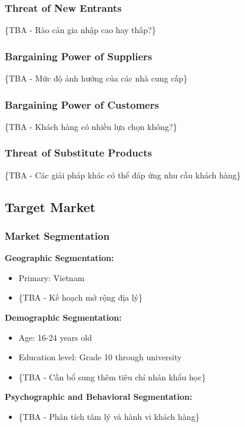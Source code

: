 \subsubsection{Threat of New Entrants}
\{TBA - Rào cản gia nhập cao hay thấp?\}

\subsubsection{Bargaining Power of Suppliers}
\{TBA - Mức độ ảnh hưởng của các nhà cung cấp\}

\subsubsection{Bargaining Power of Customers}
\{TBA - Khách hàng có nhiều lựa chọn không?\}

\subsubsection{Threat of Substitute Products}
\{TBA - Các giải pháp khác có thể đáp ứng nhu cầu khách hàng\}

\subsection{Target Market}
\subsubsection{Market Segmentation}
\textbf{Geographic Segmentation:}
\begin{itemize}
    \item Primary: Vietnam
    \item \{TBA - Kế hoạch mở rộng địa lý\}
\end{itemize}

\textbf{Demographic Segmentation:}
\begin{itemize}
    \item Age: 16-24 years old
    \item Education level: Grade 10 through university
    \item \{TBA - Cần bổ sung thêm tiêu chí nhân khẩu học\}
\end{itemize}

\textbf{Psychographic and Behavioral Segmentation:}
\begin{itemize}
    \item \{TBA - Phân tích tâm lý và hành vi khách hàng\}
\end{itemize}

